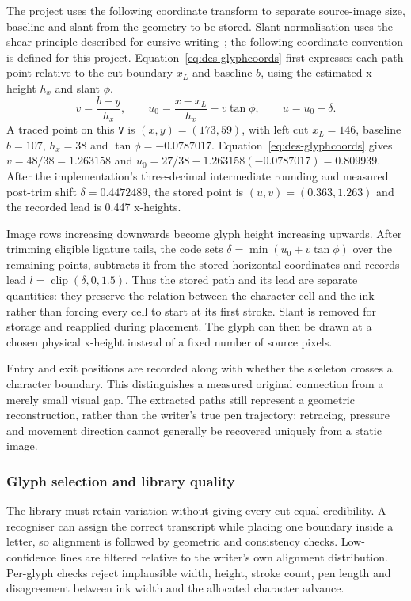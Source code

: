 The project uses the following coordinate transform to separate source-image size, baseline and slant from the geometry to be stored. Slant normalisation uses the shear principle described for cursive writing~\cite{vinciarelli2001}; the following coordinate convention is defined for this project. Equation~\ref{eq:des-glyphcoords} first expresses each path point relative to the cut boundary $x_L$ and baseline $b$, using the estimated x-height $h_x$ and slant $\phi$.
\begin{equation}
v=\frac{b-y}{h_x},\qquad
u_0=\frac{x-x_L}{h_x}-v\tan\phi,\qquad u=u_0-\delta.
\label{eq:des-glyphcoords}
\end{equation}
A traced point on this \texttt{V} is $(x,y)=(173,59)$, with left cut $x_L=146$, baseline $b=107$, $h_x=38$ and $\tan\phi=-0.0787017$. Equation~\ref{eq:des-glyphcoords} gives $v=48/38=1.263158$ and $u_0=27/38-1.263158(-0.0787017)=0.809939$. After the implementation's three-decimal intermediate rounding and measured post-trim shift $\delta=0.4472489$, the stored point is $(u,v)=(0.363,1.263)$ and the recorded lead is 0.447 x-heights.

Image rows increasing downwards become glyph height increasing upwards. After trimming eligible ligature tails, the code sets $\delta=\min(u_0+v\tan\phi)$ over the remaining points, subtracts it from the stored horizontal coordinates and records lead $l=\operatorname{clip}(\delta,0,1.5)$. Thus the stored path and its lead are separate quantities: they preserve the relation between the character cell and the ink rather than forcing every cell to start at its first stroke. Slant is removed for storage and reapplied during placement. The glyph can then be drawn at a chosen physical x-height instead of a fixed number of source pixels.

Entry and exit positions are recorded along with whether the skeleton crosses a character boundary. This distinguishes a measured original connection from a merely small visual gap. The extracted paths still represent a geometric reconstruction, rather than the writer's true pen trajectory: retracing, pressure and movement direction cannot generally be recovered uniquely from a static image.

\subsubsection{Glyph selection and library quality}
The library must retain variation without giving every cut equal credibility. A recogniser can assign the correct transcript while placing one boundary inside a letter, so alignment is followed by geometric and consistency checks. Low-confidence lines are filtered relative to the writer's own alignment distribution. Per-glyph checks reject implausible width, height, stroke count, pen length and disagreement between ink width and the allocated character advance.

